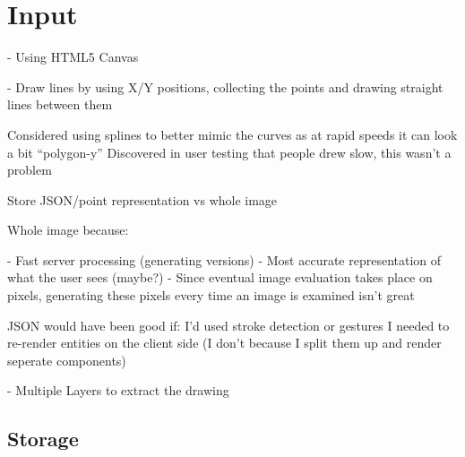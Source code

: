 \section{Input}

- Using HTML5 Canvas

- Draw lines by using X/Y positions, collecting the points and drawing straight lines between them

Considered using splines to better mimic the curves as at rapid speeds it can look a bit ``polygon-y''
Discovered in user testing that people drew slow, this wasn't a problem

Store JSON/point representation vs whole image

Whole image because:

- Fast server processing (generating versions)
- Most accurate representation of what the user sees (maybe?)
- Since eventual image evaluation takes place on pixels, generating these pixels every time an image is examined isn't great

JSON would have been good if:
I'd used stroke detection or gestures
I needed to re-render entities on the client side (I don't because I split them up and render seperate components)

- Multiple Layers to extract the drawing

\subsection{Storage}

